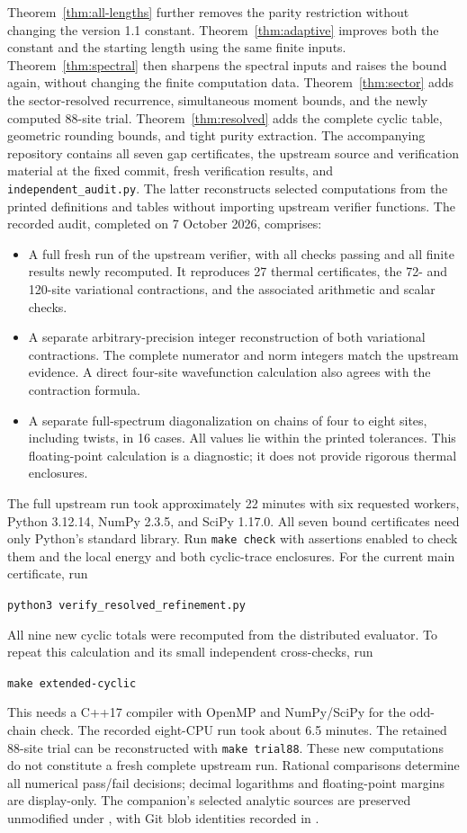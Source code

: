 \documentclass[11pt,a4paper]{article}
\begin{document}
Theorem~\ref{thm:all-lengths} further removes the parity restriction
without changing the version 1.1 constant.
Theorem~\ref{thm:adaptive} improves both the constant and the starting
length using the same finite inputs.
Theorem~\ref{thm:spectral} then sharpens the spectral inputs and raises
the bound again, without changing the finite computation data.
Theorem~\ref{thm:sector} adds the sector-resolved recurrence,
simultaneous moment bounds, and the newly computed 88-site trial.
Theorem~\ref{thm:resolved} adds the complete cyclic table, geometric
rounding bounds, and tight purity extraction.
The accompanying repository contains all seven gap certificates,
the upstream source and verification material at the fixed commit,
fresh verification results, and \texttt{independent\_audit.py}.
The latter reconstructs selected computations from the printed
definitions and tables without importing upstream verifier functions.
The recorded audit, completed on 7 October 2026, comprises:
\begin{itemize}
\item A full fresh run of the upstream verifier, with all checks passing
and all finite results newly recomputed.
It reproduces 27 thermal certificates, the 72- and 120-site variational
contractions, and the associated arithmetic and scalar checks.
\item A separate arbitrary-precision integer reconstruction of both
variational contractions. The complete numerator and norm integers
match the upstream evidence. A direct four-site wavefunction calculation
also agrees with the contraction formula.
\item A separate full-spectrum diagonalization on chains of four to
eight sites, including twists, in 16 cases. All values lie within the
printed tolerances. This floating-point calculation is a diagnostic;
it does not provide rigorous thermal enclosures.
\end{itemize}
The full upstream run took approximately 22 minutes with six requested
workers, Python 3.12.14, NumPy 2.3.5, and SciPy 1.17.0.
All seven bound certificates need only Python's standard library.
Run \texttt{make check} with assertions enabled to check them and the
local energy and both cyclic-trace enclosures. For the current main certificate, run
\begin{center}
\texttt{python3 verify\_resolved\_refinement.py}
\end{center}
All nine new cyclic totals were recomputed from the distributed evaluator.
To repeat this calculation and its small independent cross-checks, run
\begin{center}
\texttt{make extended-cyclic}
\end{center}
This needs a C++17 compiler with OpenMP and
NumPy/SciPy for the odd-chain check. The recorded eight-CPU run took
about 6.5 minutes. The retained 88-site trial can be reconstructed with
\texttt{make trial88}. These new computations do not constitute a fresh
complete upstream run.
Rational comparisons determine all numerical pass/fail decisions;
decimal logarithms and floating-point margins are display-only.
The companion's selected analytic sources are preserved unmodified
under , with Git blob identities recorded
in .
\end{document}
